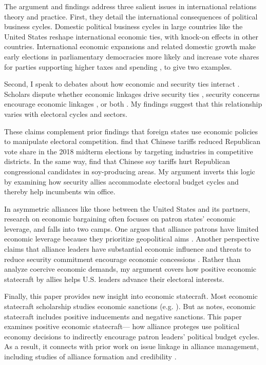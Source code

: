 \documentclass[12pt]{article}
\begin{document}
The argument and findings address three salient issues in international relations theory and practice. 
First, they detail the international consequences of political business cycles. 
Domestic political business cycles in large countries like the United States reshape international economic ties, with knock-on effects in other countries.
International economic expansions and related domestic growth make early elections in parliamentary democracies more likely \citep{Kayser2006} and increase vote shares for parties supporting higher taxes and spending \citep{Kayser2009}, to give two examples.


Second, I speak to debates about how economic and security ties interact \citep{Mastanduno2009, Poast2019}. 
Scholars dispute whether economic linkages drive security ties \citep{BiglaiserDeRouen2007, Fordham2010, Kimball2010}, security concerns encourage economic linkages \citep{Gowa1995, Li2003, LongLeeds2006, GowaMansfield2004}, or both \citep{BiglaiserDeRouen2009, KinneBunte2018}. 
My findings suggest that this relationship varies with electoral cycles and sectors.


These claims complement prior findings that foreign states use economic policies to manipulate electoral competition. 
\citet{KimMargalit2021} find that Chinese tariffs reduced Republican vote share in the 2018 midterm elections by targeting industries in competitive districts.
In the same way, \cite{ChyzhUrbatsch2021} find that Chinese soy tariffs hurt Republican congressional candidates in soy-producing areas. 
My argument inverts this logic by examining how security allies accommodate electoral budget cycles and thereby help incumbents win office. 


In asymmetric alliances like those between the United States and its partners, research on economic bargaining often focuses on patron states' economic leverage, and falls into two camps. 
One argues that alliance patrons have limited economic leverage because they prioritize geopolitical aims \citep{Drezner2013, WolfordKim2017}.
Another perspective claims that alliance leaders have substantial economic influence \citep{Norrlof2010, Brooksetal2013} and threats to reduce security commitment encourage economic concessions \citep[pg. 122]{Oatley2015}.
Rather than analyze coercive economic demands, my argument covers how positive economic statecraft by allies helps U.S. leaders advance their electoral interests.


Finally, this paper provides new insight into economic statecraft. 
Most economic statecraft scholarship studies economic sanctions (e.g. \cite{Marinov2005, Allen2008, Escriba-FolchWright2010}).
But as \citet{Baldwin2020} notes, economic statecraft includes positive inducements and negative sanctions. 
This paper examines positive economic statecraft--- how alliance proteges use political economy decisions to indirectly encourage patron leaders' political budget cycles.
As a result, it connects with prior work on issue linkage in alliance management, including studies of alliance formation \citep{Poast2012} and credibility \citep{Davis2008, Poast2013}. 
\end{document}
